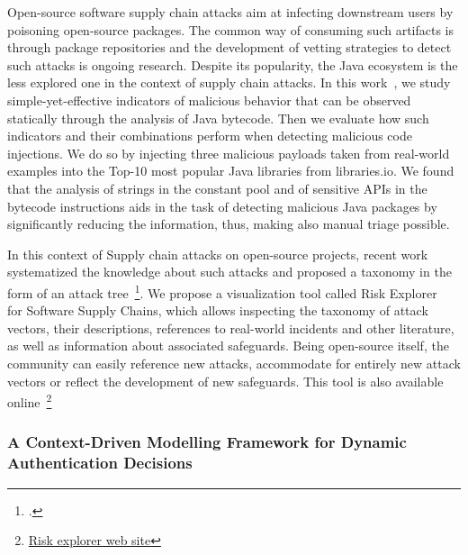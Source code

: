 Open-source software supply chain attacks aim at infecting downstream users by poisoning open-source packages. The common way of consuming such artifacts is through package repositories and the development of vetting strategies to detect such attacks is ongoing research. Despite its popularity, the Java ecosystem is the less explored one in the context of supply chain attacks. In this work~\cite{ladisa:hal-03921362}, we study simple-yet-effective indicators of malicious behavior that can be observed statically through the analysis of Java bytecode. Then we evaluate how such indicators and their combinations perform when detecting malicious code injections. We do so by injecting three malicious payloads taken from real-world examples into the Top-10 most popular Java libraries from libraries.io. We found that the analysis of strings in the constant pool and of sensitive APIs in the bytecode instructions aids in the task of detecting malicious Java packages by significantly reducing the information, thus, making also manual triage possible.


In this context of Supply chain attacks on open-source projects, recent work systematized the knowledge about such attacks and proposed a taxonomy in the form of an attack tree~\footcite{snp23ladisa}. We propose a visualization tool called Risk Explorer~\cite{ladisa:hal-03921373} for Software Supply Chains, which allows inspecting the taxonomy of attack vectors, their descriptions, references to real-world incidents and other literature, as well as information about associated safeguards. Being open-source itself, the community can easily reference new attacks, accommodate for entirely new attack vectors or reflect the development of new safeguards. This tool is also available online~\footnote{\href{https://sap.github.io/risk-explorer-for-software-supply-chains/}{Risk explorer web site}}


\subsubsection{A Context-Driven Modelling Framework for Dynamic Authentication Decisions}

